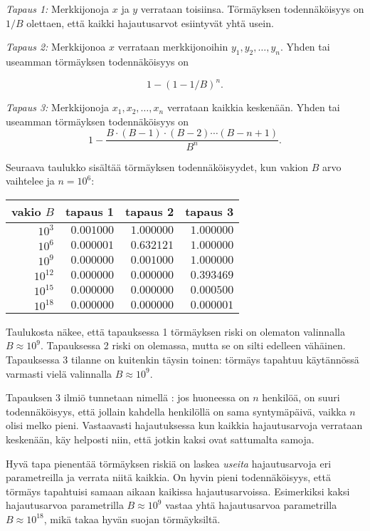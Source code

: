 \textit{Tapaus 1:} Merkkijonoja $x$ ja $y$ verrataan toisiinsa.
Törmäyksen todennäköisyys on $1/B$ olettaen,
että kaikki hajautusarvot esiintyvät yhtä usein.

\textit{Tapaus 2:} Merkkijonoa $x$ verrataan merkkijonoihin
$y_1,y_2,\ldots,y_n$.
Yhden tai useamman törmäyksen todennäköisyys on

\[1-(1-1/B)^n.\]

\textit{Tapaus 3:} Merkkijonoja $x_1,x_2,\ldots,x_n$
verrataan kaikkia keskenään.
Yhden tai useamman törmäyksen todennäköisyys on
\[ 1 - \frac{B \cdot (B-1) \cdot (B-2) \cdots (B-n+1)}{B^n}.\]

Seuraava taulukko sisältää törmäyksen todennäköisyydet,
kun vakion $B$ arvo vaihtelee ja $n=10^6$:

\begin{center}
\begin{tabular}{rrrr}
vakio $B$ & tapaus 1 & tapaus 2 & tapaus 3 \\
\hline
$10^3$ & $0.001000$ & $1.000000$ & $1.000000$ \\
$10^6$ & $0.000001$ & $0.632121$ & $1.000000$ \\
$10^9$ & $0.000000$ & $0.001000$ & $1.000000$ \\
$10^{12}$ & $0.000000$ & $0.000000$ & $0.393469$ \\
$10^{15}$ & $0.000000$ & $0.000000$ & $0.000500$ \\
$10^{18}$ & $0.000000$ & $0.000000$ & $0.000001$ \\
\end{tabular}
\end{center}

Taulukosta näkee, että tapauksessa 1
törmäyksen riski on olematon
valinnalla $B \approx 10^9$.
Tapauksessa 2 riski on olemassa, mutta se on silti edelleen vähäinen.
Tapauksessa 3 tilanne on kuitenkin täysin toinen:
törmäys tapahtuu käytännössä varmasti
vielä valinnalla $B \approx 10^9$.


Tapauksen 3 ilmiö tunnetaan nimellä
:
jos huoneessa on $n$ henkilöä, on suuri
todennäköisyys, että jollain kahdella
henkilöllä on sama syntymäpäivä, vaikka
$n$ olisi melko pieni.
Vastaavasti hajautuksessa kun kaikkia
hajautusarvoja verrataan keskenään,
käy helposti niin, että jotkin
kaksi ovat sattumalta samoja.

Hyvä tapa pienentää törmäyksen riskiä on laskea
\emph{useita} hajautusarvoja eri parametreilla
ja verrata niitä kaikkia.
On hyvin pieni todennäköisyys,
että törmäys tapahtuisi samaan aikaan
kaikissa hajautusarvoissa.
Esimerkiksi kaksi hajautusarvoa parametrilla
$B \approx 10^9$ vastaa yhtä hajautusarvoa
parametrilla $B \approx 10^{18}$,
mikä takaa hyvän suojan törmäyksiltä.

